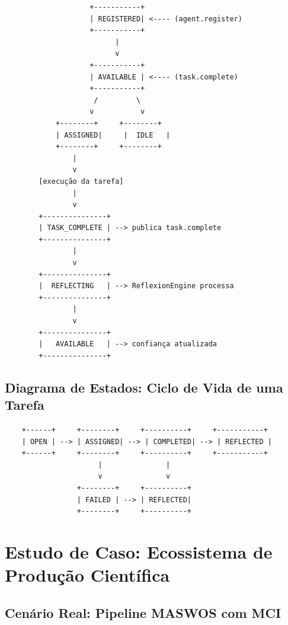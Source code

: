 \begin{verbatim}
                    +-----------+
                    | REGISTERED| <---- (agent.register)
                    +-----------+
                          |
                          v
                    +-----------+
                    | AVAILABLE | <---- (task.complete)
                    +-----------+
                     /         \
                    v           v
            +--------+     +--------+
            | ASSIGNED|     |  IDLE   |
            +--------+     +--------+
                |
                v
        [execução da tarefa]
                |
                v
        +---------------+
        | TASK_COMPLETE | --> publica task.complete
        +---------------+
                |
                v
        +---------------+
        |  REFLECTING   | --> ReflexionEngine processa
        +---------------+
                |
                v
        +---------------+
        |   AVAILABLE   | --> confiança atualizada
        +---------------+
\end{verbatim}

\subsection{Diagrama de Estados: Ciclo de Vida de uma Tarefa}

\begin{verbatim}
    +------+     +--------+     +----------+     +-----------+
    | OPEN | --> | ASSIGNED| --> | COMPLETED| --> | REFLECTED |
    +------+     +--------+     +----------+     +-----------+
                      |               |
                      v               v
                 +--------+     +----------+
                 | FAILED | --> | REFLECTED|
                 +--------+     +----------+
\end{verbatim}

\section{Estudo de Caso: Ecossistema de Produção Científica}
\label{sec:case-study}

\subsection{Cenário Real: Pipeline MASWOS com MCI}

